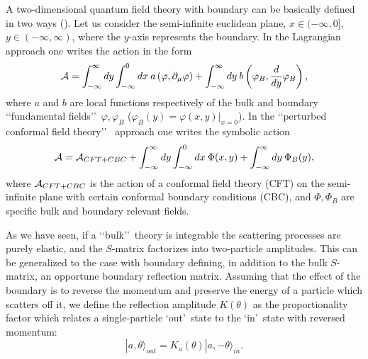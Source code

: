 \documentclass[a4paper,12pt]{report}
\begin{document}
A two-dimensional quantum field theory with boundary can be basically defined in two ways (\cite{ghoszam}). Let us
consider the semi-infinite euclidean plane, $x\in (-\infty,0]$, $y\in (-\infty,\infty)$, where the $y$-axis
represents the boundary. In the Lagrangian approach one writes the action in the form
\begin{equation}\label{lagr}
{\cal A}=\int_{-\infty}^{\infty}dy\int_{-\infty}^{0}dx\:
a\left(\varphi,\partial_{\mu}\varphi\right)+\int_{-\infty}^{\infty}dy
\:b\left(\varphi_{B},\frac{d}{dy}\varphi_{B}\right),
\end{equation}
where $a$ and $b$ are local functions respectively of the bulk and boundary \lq\lq fundamental fields\rq\rq \,
$\varphi,\varphi_{B}$ ($\varphi_{B}(y)=\varphi(x,y)|_{x=0}$). In the \lq\lq perturbed conformal field theory\rq\rq
\, approach one writes the symbolic action
\begin{equation}\label{pert}
{\cal A}={\cal A}_{CFT+CBC}+\int_{-\infty}^{\infty}dy\int_{-\infty}^{0}dx\: \Phi(x,y)+\int_{-\infty}^{\infty}dy
\:\Phi_{B}(y),
\end{equation}
where ${\cal A}_{CFT+CBC}$ is the action of a conformal field theory (CFT) on the semi-infinite plane with certain
conformal boundary conditions (CBC), and $\Phi,\Phi_{B}$ are specific bulk and boundary relevant fields.


As we have seen, if a \lq\lq bulk\rq\rq \, theory is integrable the scattering processes are purely elastic, and
the $S$-matrix factorizes into two-particle amplitudes. This can be generalized to the case with boundary
defining, in addition to the bulk $S$-matrix, an opportune boundary reflection matrix. Assuming that the effect
of the boundary is to reverse the momentum and preserve the energy of a particle which scatters off it, we define
the reflection amplitude $K(\theta)$ as the proportionality factor which relates a single-particle \lq out\rq \,
state to the \lq in\rq \, state with reversed momentum:
\begin{equation}
|a,\theta\rangle_{out}=K_{a}\left(\theta\right)|a,-\theta\rangle_{in}.
\end{equation}

\vspace{5cm}
\end{document}
